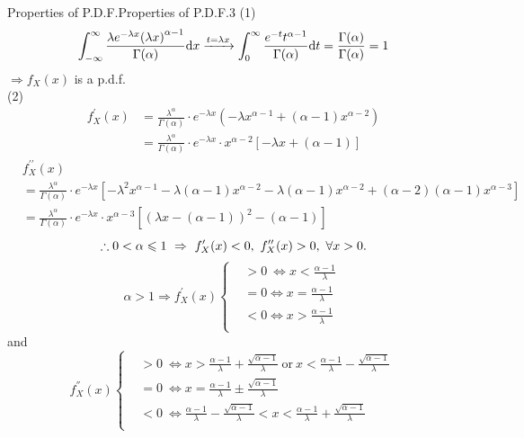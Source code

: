 \documentclass{elegantbook}
\begin{document}
\begin{remark}{Properties of P.D.F.}{Properties of P.D.F.3}
(1)
$$
\int_{-\infty}^{\infty}\frac{\lambda e^{-\lambda x}{(\lambda x)}^{\alpha-1}}{{\Gamma}(\alpha)}\dif x\xrightarrow{t=\lambda x}\int_{0}^{\infty}\frac{e^{-t}t^{\alpha-1}}{{\Gamma}(\alpha)}\dif t=\frac{{\Gamma}(\alpha)}{{\Gamma}(\alpha)}=1
$$
$\Rightarrow f_X(x)$ is a p.d.f.\\
(2) 
$$\begin{aligned}
f_X^\prime(x)&=\frac{\lambda^\alpha}{{\Gamma}(\alpha)}\cdot e^{-\lambda x}\left(-\lambda x^{\alpha-1}+\left(\alpha-1\right)x^{\alpha-2}\right)\\
&=\frac{\lambda^\alpha}{{\Gamma}(\alpha)}\cdot e^{-\lambda x}\cdot x^{\alpha-2}\left[-\lambda x+\left(\alpha-1\right)\right]
\end{aligned}$$
$$\begin{aligned}
&f_X^{\prime\prime}(x)\\
&=\frac{\lambda^\alpha}{{\Gamma}(\alpha)}\cdot e^{-\lambda x}\left[-\lambda^2x^{\alpha-1}-\lambda\left(\alpha-1\right)x^{\alpha-2}-\lambda\left(\alpha-1\right)x^{\alpha-2}+(\alpha-2)\left(\alpha-1\right)x^{\alpha-3}\right]\\
&=\frac{\lambda^\alpha}{{\Gamma}(\alpha)}\cdot e^{-\lambda x}\cdot x^{\alpha-3}\left[\left(\lambda x-\left(\alpha-1\right)\right)^2-\left(\alpha-1\right)\right]
\end{aligned}$$
$$
\therefore0<\alpha\ls1\ \Rightarrow\ f_X^\prime(x)<0,\ f_X^{\prime\prime}(x)>0,\ \forall x>0.
$$
\[\alpha > 1 \Rightarrow f_{X}^{'}(x)\left\{ \begin{aligned}
 &> 0\  \Leftrightarrow x < \frac{\alpha - 1}{\lambda} \\
 &= 0 \Leftrightarrow x = \frac{\alpha - 1}{\lambda} \\
 &< 0 \Leftrightarrow x > \frac{\alpha - 1}{\lambda} \\
\end{aligned} \right.\ \]
and
\[f_{X}^{''}(x)\left\{ \begin{aligned}
& > 0\  \Leftrightarrow x > \frac{\alpha - 1}{\lambda} + \frac{\sqrt{\alpha - 1}}{\lambda}\ \text{or}\ x < \frac{\alpha - 1}{\lambda} - \frac{\sqrt{\alpha - 1}}{\lambda} \\
 &= 0\  \Leftrightarrow x = \frac{\alpha - 1}{\lambda} \pm \frac{\sqrt{\alpha - 1}}{\lambda} \\
& < 0\  \Leftrightarrow\frac{\alpha - 1}{\lambda} - \frac{\sqrt{\alpha - 1}}{\lambda} < x < \frac{\alpha - 1}{\lambda} + \frac{\sqrt{\alpha - 1}}{\lambda}\\
\end{aligned} \right.\ \]
\end{remark}
\end{document}
